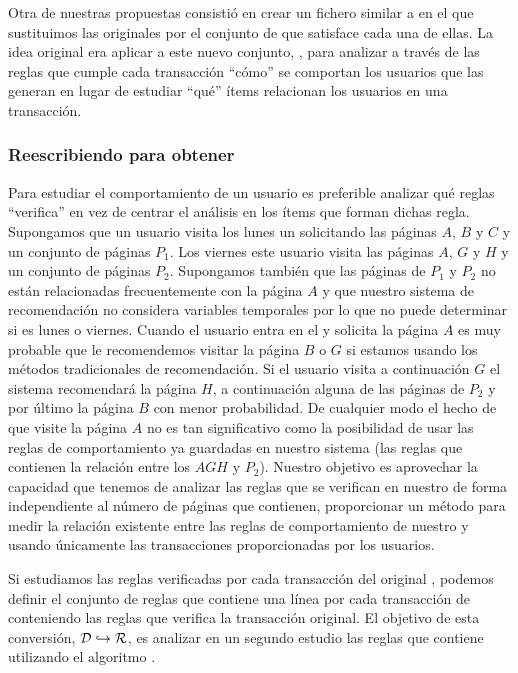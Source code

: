 
Otra de nuestras propuestas consistió en crear un fichero similar a \D en el que sustituimos las \transacciones originales por el conjunto de \ars que satisface cada una de ellas. La idea original era aplicar \apriori a este nuevo conjunto, \R, para analizar a través de las reglas que cumple cada transacción "`cómo"' se comportan los usuarios que las generan en lugar de estudiar "`qué"' ítems relacionan los usuarios en una transacción.

\subsubsection{Reescribiendo \D para obtener \R}
Para estudiar el comportamiento de un usuario es preferible analizar qué reglas "`verifica"' en vez de centrar el análisis en los ítems que forman dichas regla. Supongamos que un usuario visita los lunes un \portalWeb solicitando las páginas $A$, $B$ y $C$ y un conjunto de páginas $P_1$. Los viernes este usuario visita las páginas $A$, $G$ y $H$ y un conjunto de páginas $P_2$. Supongamos también que las páginas de $P_1$ y $P_2$ no están relacionadas frecuentemente con la página $A$ y que nuestro sistema de recomendación no considera variables temporales por lo que no puede determinar si es lunes o viernes. Cuando el usuario entra en el \portalWeb y solicita la página $A$ es muy probable que le recomendemos visitar la página $B$ o $G$ si estamos usando los métodos tradicionales de recomendación. Si el usuario visita a continuación $G$ el sistema recomendará la página $H$, a continuación alguna de las páginas de $P_2$ y por último la página $B$ con menor probabilidad. De cualquier modo el hecho de que visite la página $A$ no es tan significativo como la posibilidad de usar las reglas de comportamiento ya guardadas en nuestro sistema (las reglas que contienen la relación entre los \kitemsets $AGH$ y $P_2$). Nuestro objetivo es aprovechar la capacidad que tenemos de analizar las reglas que se verifican en nuestro \portalWeb de forma independiente al número de páginas que contienen, proporcionar un método para medir la relación existente entre las reglas de comportamiento de nuestro \portalWeb y usando únicamente las transacciones proporcionadas por los usuarios.

Si estudiamos las reglas verificadas por cada transacción del \dataset original \D, podemos definir el conjunto de reglas \R que contiene una línea por cada transacción de \D conteniendo las reglas que verifica la transacción original. El objetivo de esta conversión, $\D\hookrightarrow\R$, es analizar en un segundo estudio las reglas que contiene \R utilizando el algoritmo \apriori.

